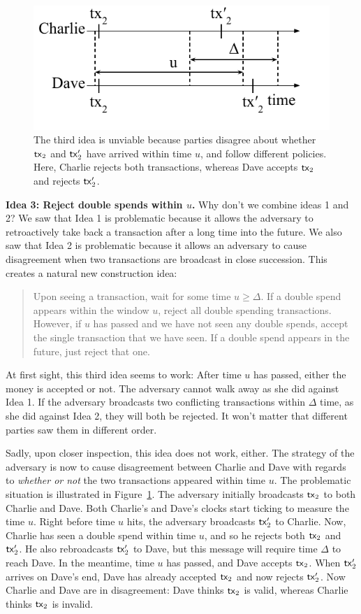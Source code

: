 \begin{figure}[h]
    \centering
    \includegraphics[width=0.45 \columnwidth,keepaspectratio]{figures/simple-idea-3.pdf}
    \caption{The third idea is unviable because parties
    disagree about whether $\mathsf{tx}_2$ and $\mathsf{tx}_2'$ have arrived within time $u$,
    and follow different policies. Here, Charlie rejects both transactions, whereas
    Dave accepts $\mathsf{tx}_2$ and rejects $\mathsf{tx}_2'$.}
    \label{fig.simple-idea-3}
\end{figure}

\noindent
\textbf{Idea 3: Reject double spends within $u$.} Why don't we combine ideas 1 and 2? We saw that
Idea 1 is problematic because it allows the adversary to retroactively take back a transaction after
a long time into the future. We also saw that Idea 2 is problematic because it allows an adversary to
cause disagreement when two transactions are broadcast in close succession. This creates a natural
new construction idea:

\begin{quote}
Upon seeing a transaction, wait for some time $u \geq \Delta$. If a double spend
appears within the window $u$, reject all double spending transactions. However, if $u$ has passed and we have
not seen any double spends, accept the single transaction that we have seen. If a double spend appears in
the future, just reject that one.
\end{quote}

At first sight, this third idea seems to work: After time $u$ has passed, either the money is accepted or not.
The adversary cannot walk away as she did against Idea 1. If the adversary broadcasts two conflicting
transactions within $\Delta$ time, as she did against Idea 2, they will both be rejected. It won't matter
that different parties saw them in different order.

Sadly, upon closer inspection, this idea does not work,
either. The strategy of the adversary is now to cause disagreement between Charlie and Dave with
regards to \emph{whether or not} the two transactions appeared within time $u$. The problematic situation
is illustrated in Figure~\ref{fig.simple-idea-3}. The adversary initially broadcasts $\mathsf{tx}_2$
to both Charlie and Dave. Both Charlie's and Dave's clocks start ticking to measure the time $u$.
Right before time $u$ hits, the adversary broadcasts $\mathsf{tx}_2'$ to Charlie. Now, Charlie has seen
a double spend within time $u$, and so he rejects both $\mathsf{tx}_2$ and $\mathsf{tx}_2'$. He also rebroadcasts
$\mathsf{tx}_2'$ to Dave, but this message will require time $\Delta$ to reach Dave. In the meantime,
time $u$ has passed, and Dave accepts $\mathsf{tx}_2$. When $\mathsf{tx}_2'$ arrives on Dave's end, Dave has
already accepted $\mathsf{tx}_2$ and now rejects $\mathsf{tx}_2'$. Now Charlie and Dave are in disagreement:
Dave thinks $\mathsf{tx}_2$ is valid, whereas Charlie thinks $\mathsf{tx}_2$ is invalid.

